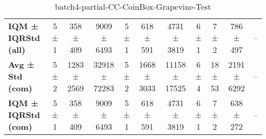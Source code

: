 \begin{table}[!ht]
\begin{tabular}{l|ccc|ccc|cccc}
\textbf{IQM ± IQRStd (all)} & 5 ± 1 & 358 ± 409 & 9009 ± 6493 & 5 ± 1 & 618 ± 591 & 4731 ± 3819 & 6 ± 1 & 7 ± 2 & 786 ± 497 & -- \\
\textbf{Avg ± Std (com)} & 5 ± 2 & 1283 ± 2569 & 32918 ± 72283 & 5 ± 2 & 1668 ± 3033 & 11158 ± 17525 & 6 ± 4 & 18 ± 53 & 2191 ± 6292 & -- \\
\textbf{IQM ± IQRStd (com)} & 5 ± 1 & 358 ± 409 & 9009 ± 6493 & 5 ± 1 & 618 ± 591 & 4731 ± 3819 & 6 ± 1 & 7 ± 2 & 638 ± 272 & -- \\
\end{tabular}
\caption{batch4-partial-CC-CoinBox-Grapevine-Test}
\label{tab:batch4_partial_CC-CoinBox-Grapevine_comparison_test}
\end{table}
